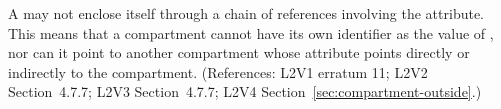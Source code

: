 A \Compartment may not enclose itself through a chain of references
involving the  attribute.  This means that a compartment cannot
have its own identifier as the value of , nor can it point
to another compartment whose  attribute points directly or
indirectly to the compartment.  (References: L2V1 erratum 11; L2V2 Section~4.7.7;
L2V3 Section~4.7.7; L2V4 Section~\ref{sec:compartment-outside}.)
